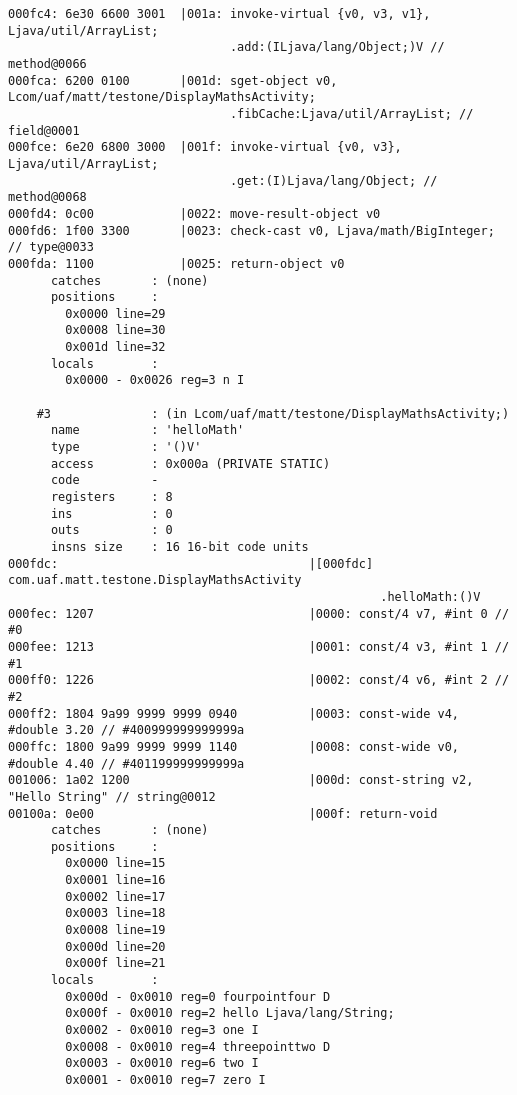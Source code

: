 \begin{lstlisting}
000fc4: 6e30 6600 3001  |001a: invoke-virtual {v0, v3, v1}, Ljava/util/ArrayList;
                               .add:(ILjava/lang/Object;)V // method@0066
000fca: 6200 0100       |001d: sget-object v0, Lcom/uaf/matt/testone/DisplayMathsActivity;
                               .fibCache:Ljava/util/ArrayList; // field@0001
000fce: 6e20 6800 3000  |001f: invoke-virtual {v0, v3}, Ljava/util/ArrayList;
                               .get:(I)Ljava/lang/Object; // method@0068
000fd4: 0c00            |0022: move-result-object v0
000fd6: 1f00 3300       |0023: check-cast v0, Ljava/math/BigInteger; // type@0033
000fda: 1100            |0025: return-object v0
      catches       : (none)
      positions     :
        0x0000 line=29
        0x0008 line=30
        0x001d line=32
      locals        :
        0x0000 - 0x0026 reg=3 n I

    #3              : (in Lcom/uaf/matt/testone/DisplayMathsActivity;)
      name          : 'helloMath'
      type          : '()V'
      access        : 0x000a (PRIVATE STATIC)
      code          -
      registers     : 8
      ins           : 0
      outs          : 0
      insns size    : 16 16-bit code units
000fdc:                                   |[000fdc] com.uaf.matt.testone.DisplayMathsActivity
                                                    .helloMath:()V
000fec: 1207                              |0000: const/4 v7, #int 0 // #0
000fee: 1213                              |0001: const/4 v3, #int 1 // #1
000ff0: 1226                              |0002: const/4 v6, #int 2 // #2
000ff2: 1804 9a99 9999 9999 0940          |0003: const-wide v4, #double 3.20 // #400999999999999a
000ffc: 1800 9a99 9999 9999 1140          |0008: const-wide v0, #double 4.40 // #401199999999999a
001006: 1a02 1200                         |000d: const-string v2, "Hello String" // string@0012
00100a: 0e00                              |000f: return-void
      catches       : (none)
      positions     :
        0x0000 line=15
        0x0001 line=16
        0x0002 line=17
        0x0003 line=18
        0x0008 line=19
        0x000d line=20
        0x000f line=21
      locals        :
        0x000d - 0x0010 reg=0 fourpointfour D
        0x000f - 0x0010 reg=2 hello Ljava/lang/String;
        0x0002 - 0x0010 reg=3 one I
        0x0008 - 0x0010 reg=4 threepointtwo D
        0x0003 - 0x0010 reg=6 two I
        0x0001 - 0x0010 reg=7 zero I


\end{lstlisting}
